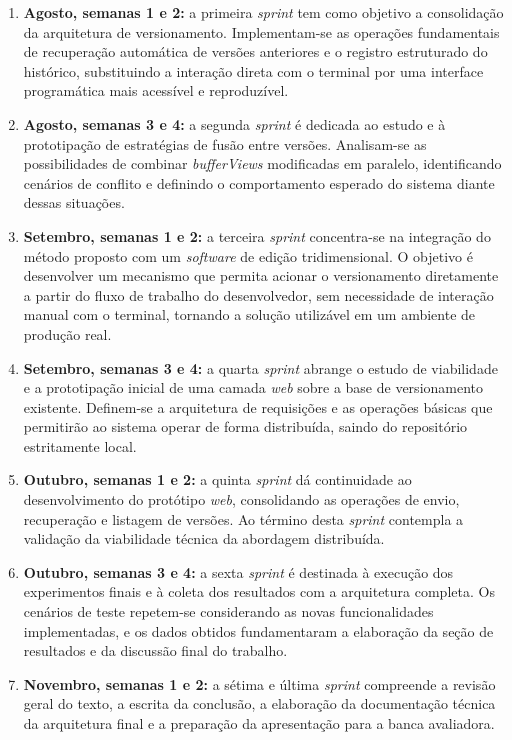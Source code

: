 \begin{enumerate}
  \item \textbf{Agosto, semanas 1 e 2:} a primeira \textit{sprint} tem como objetivo
  a consolidação da arquitetura de versionamento. Implementam-se as operações
  fundamentais de recuperação automática de versões anteriores e o registro
  estruturado do histórico, substituindo a interação direta com o terminal por uma
  interface programática mais acessível e reproduzível.

  \item \textbf{Agosto, semanas 3 e 4:} a segunda \textit{sprint} é dedicada ao
  estudo e à prototipação de estratégias de fusão entre versões. Analisam-se as
  possibilidades de combinar \textit{bufferViews} modificadas em paralelo,
  identificando cenários de conflito e definindo o comportamento esperado do sistema
  diante dessas situações.

  \item \textbf{Setembro, semanas 1 e 2:} a terceira \textit{sprint} concentra-se na
  integração do método proposto com um \textit{software} de edição tridimensional. O
  objetivo é desenvolver um mecanismo que permita acionar o versionamento
  diretamente a partir do fluxo de trabalho do desenvolvedor, sem necessidade de
  interação manual com o terminal, tornando a solução utilizável em um ambiente de
  produção real.

  \item \textbf{Setembro, semanas 3 e 4:} a quarta \textit{sprint} abrange o estudo
  de viabilidade e a prototipação inicial de uma camada \textit{web} sobre a base de
  versionamento existente. Definem-se a arquitetura de requisições e as operações
  básicas que permitirão ao sistema operar de forma distribuída, saindo do
  repositório estritamente local.

  \item \textbf{Outubro, semanas 1 e 2:} a quinta \textit{sprint} dá continuidade ao
  desenvolvimento do protótipo \textit{web}, consolidando as operações de envio,
  recuperação e listagem de versões. Ao término desta \textit{sprint} contempla a
  validação da viabilidade técnica da abordagem distribuída.

  \item \textbf{Outubro, semanas 3 e 4:} a sexta \textit{sprint} é destinada à
  execução dos experimentos finais e à coleta dos resultados com a arquitetura
  completa. Os cenários de teste repetem-se considerando as novas funcionalidades
  implementadas, e os dados obtidos fundamentaram a elaboração da seção de
  resultados e da discussão final do trabalho.

  \item \textbf{Novembro, semanas 1 e 2:} a sétima e última \textit{sprint}
  compreende a revisão geral do texto, a escrita da conclusão, a elaboração da
  documentação técnica da arquitetura final e a preparação da apresentação para a
  banca avaliadora.
\end{enumerate}

